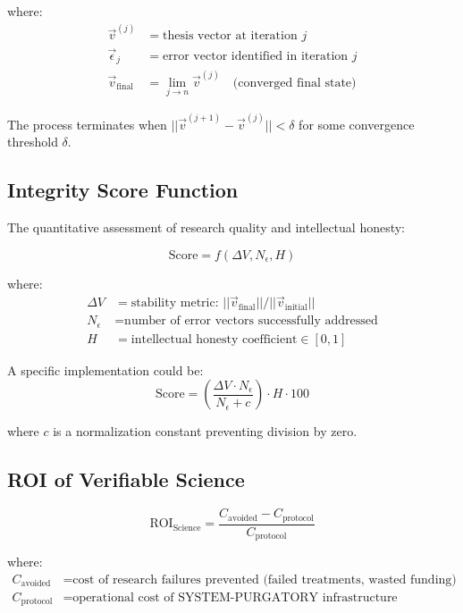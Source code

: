 \documentclass[11pt,a4paper]{article}
\begin{document}
\begin{small}
where:
\begin{align*}
\vec{v}^{(j)} &= \text{thesis vector at iteration } j \\
\vec{\epsilon}_j &= \text{error vector identified in iteration } j \\
\vec{v}_{\text{final}} &= \lim_{j \to n} \vec{v}^{(j)} \quad \text{(converged final state)}
\end{align*}

\noindent The process terminates when $||\vec{v}^{(j+1)} - \vec{v}^{(j)}|| < \delta$ for some convergence threshold $\delta$.

\subsection*{Integrity Score Function}
The quantitative assessment of research quality and intellectual honesty:

\begin{equation}
\text{Score} = f(\Delta V, N_{\epsilon}, H)
\label{eq:integrity_score}
\end{equation}

where:
\begin{align*}
\Delta V &= \text{stability metric: } ||\vec{v}_{\text{final}}|| / ||\vec{v}_{\text{initial}}|| \\
N_{\epsilon} &= \text{number of error vectors successfully addressed} \\
H &= \text{intellectual honesty coefficient} \in [0, 1]
\end{align*}

\noindent A specific implementation could be:
\begin{equation}
\text{Score} = \left(\frac{\Delta V \cdot N_{\epsilon}}{N_{\epsilon} + c}\right) \cdot H \cdot 100
\label{eq:score_implementation}
\end{equation}

where $c$ is a normalization constant preventing division by zero.

\subsection*{ROI of Verifiable Science}
\begin{equation}
\text{ROI}_{\text{Science}} = \frac{C_{\text{avoided}} - C_{\text{protocol}}}{C_{\text{protocol}}}
\label{eq:roi_science}
\end{equation}

where:
\begin{align*}
C_{\text{avoided}} &= \text{cost of research failures prevented (failed treatments, wasted funding)} \\
C_{\text{protocol}} &= \text{operational cost of SYSTEM-PURGATORY infrastructure}
\end{align*}


\end{small}
\end{document}
